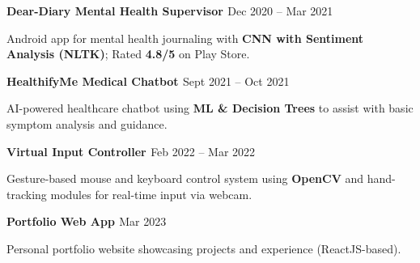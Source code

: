 \textbf{Dear-Diary Mental Health Supervisor \href{https://github.com/priyansh17/dear-diary}{\faExternalLinkSquare}}
\hfill {\faCalendar} Dec 2020 – Mar 2021 \par
Android app for mental health journaling with \textbf{CNN with Sentiment Analysis (NLTK)}; Rated \textbf{4.8/5} on Play Store. \par

\textbf{HealthifyMe Medical Chatbot \href{https://github.com/priyansh17/healthify-life-medical-chatbot}{\faExternalLinkSquare}}
\hfill {\faCalendar} Sept 2021 – Oct 2021 \par
AI-powered healthcare chatbot using \textbf{ML \& Decision Trees} to assist with basic symptom analysis and guidance. \par

\textbf{Virtual Input Controller \href{https://github.com/priyansh17/virtual-input-controller}{\faExternalLinkSquare}}
\hfill {\faCalendar} Feb 2022 – Mar 2022 \par
Gesture-based mouse and keyboard control system using \textbf{OpenCV} and hand-tracking modules for real-time input via webcam. \par

\textbf{Portfolio Web App \href{https://github.com/priyansh17/portfolio}{\faExternalLinkSquare}}
\hfill {\faCalendar} Mar 2023 \par
Personal portfolio website showcasing projects and experience (ReactJS-based). \par